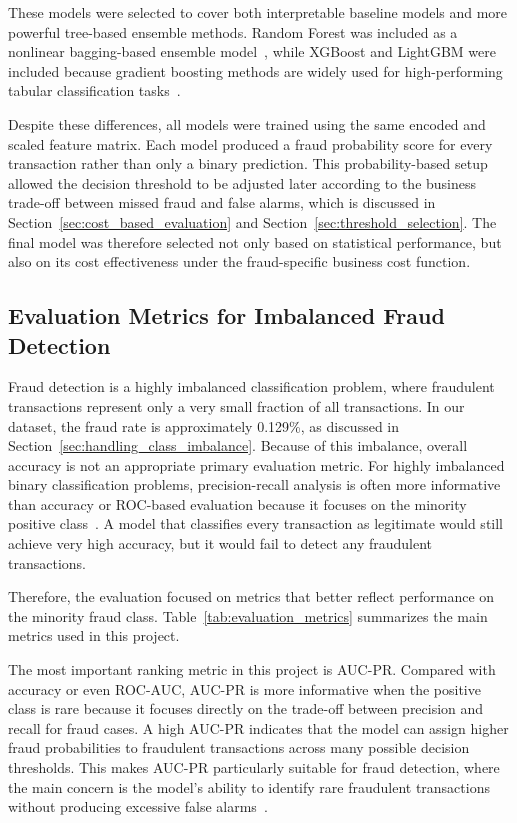 

These models were selected to cover both interpretable baseline models and more powerful tree-based ensemble methods. Random Forest was included as a nonlinear bagging-based ensemble model~\cite{breiman2001random}, while XGBoost and LightGBM were included because gradient boosting methods are widely used for high-performing tabular classification tasks~\cite{chen2016xgboost,ke2017lightgbm}.

Despite these differences, all models were trained using the same encoded and scaled feature matrix. Each model produced a fraud probability score for every transaction rather than only a binary prediction. This probability-based setup allowed the decision threshold to be adjusted later according to the business trade-off between missed fraud and false alarms, which is discussed in Section~\ref{sec:cost_based_evaluation} and Section~\ref{sec:threshold_selection}. The final model was therefore selected not only based on statistical performance, but also on its cost effectiveness under the fraud-specific business cost function.

\subsection{Evaluation Metrics for Imbalanced Fraud Detection}
\label{sec:evaluation_metrics}

Fraud detection is a highly imbalanced classification problem, where fraudulent transactions represent only a very small fraction of all transactions. In our dataset, the fraud rate is approximately 0.129\%, as discussed in Section~\ref{sec:handling_class_imbalance}. Because of this imbalance, overall accuracy is not an appropriate primary evaluation metric. For highly imbalanced binary classification problems, precision-recall analysis is often more informative than accuracy or ROC-based evaluation because it focuses on the minority positive class~\cite{saito2015precision,davis2006relationship}. A model that classifies every transaction as legitimate would still achieve very high accuracy, but it would fail to detect any fraudulent transactions.

Therefore, the evaluation focused on metrics that better reflect performance on the minority fraud class. Table~\ref{tab:evaluation_metrics} summarizes the main metrics used in this project.




The most important ranking metric in this project is AUC-PR. Compared with accuracy or even ROC-AUC, AUC-PR is more informative when the positive class is rare because it focuses directly on the trade-off between precision and recall for fraud cases. A high AUC-PR indicates that the model can assign higher fraud probabilities to fraudulent transactions across many possible decision thresholds. This makes AUC-PR particularly suitable for fraud detection, where the main concern is the model's ability to identify rare fraudulent transactions without producing excessive false alarms~\cite{saito2015precision}.

